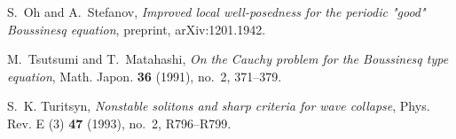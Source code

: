 \documentclass{amsart}
\begin{document}
\begin{thebibliography}{10}
S.~Oh and A.~Stefanov, \emph{Improved local well-posedness for the periodic
  "good" {B}oussinesq equation}, preprint, arXiv:1201.1942.

M.~Tsutsumi and T.~Matahashi, \emph{On the {C}auchy problem for the
  {B}oussinesq type equation}, Math. Japon. \textbf{36} (1991), no.~2,
  371--379.

S.~K. Turitsyn, \emph{Nonstable solitons and sharp criteria for wave collapse},
  Phys. Rev. E (3) \textbf{47} (1993), no.~2, R796--R799.

\end{thebibliography}



\end{document}
